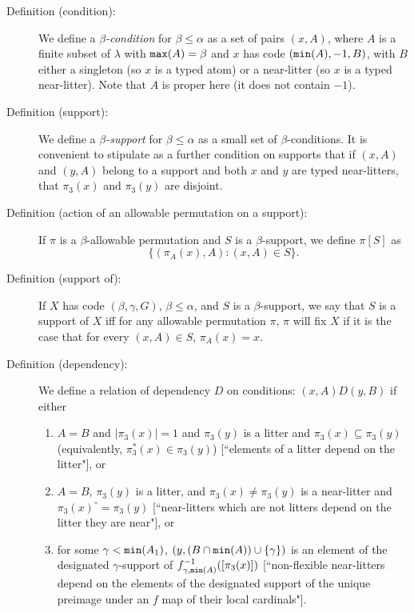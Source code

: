\documentclass[112pt]{article}
\begin{document}
\begin{description}

\item[Definition (condition):]  We define a {\em $\beta$-condition\/} for $\beta\leq \alpha$ as a set of pairs $(x,A)$, where $A$ is a finite subset of $\lambda$ with ${\tt max}(A)=\beta$ and $x$ has code $({\tt min}(A),-1,B)$, with $B$ either a singleton (so $x$ is a typed atom) or a near-litter (so $x$ is a typed near-litter).  Note that $A$ is proper here (it does not contain $-1$).

\item[Definition (support):]  We define a {\em $\beta$-support\/} for $\beta\leq\alpha$ as a small set of $\beta$-conditions.  It is convenient to stipulate
as a further condition on supports that if $(x,A)$ and $(y,A)$ belong to a support and both $x$ and $y$ are typed near-litters, that $\pi_3(x)$ and $\pi_3(y)$  are disjoint.

\item[Definition (action of an allowable permutation on a support):]  If $\pi$ is a $\beta$-allowable permutation and $S$ is a $\beta$-support,
we define $\pi[S]$ as $$\{(\pi_A(x),A):(x,A) \in S\}.$$

\item[Definition (support of):]  If $X$ has code $(\beta,\gamma,G)$, $\beta\leq \alpha$, and $S$ is a $\beta$-support, we say that $S$ is a support of $X$ 
iff for any allowable permutation $\pi$, $\pi$ will fix $X$ if it is the case that for every $(x,A)\in S$, $\pi_A(x)=x$.

\item[Definition (dependency):]  We define a relation of dependency $D$ on conditions:  $(x,A)D(y,B)$  if either 

\begin{enumerate}
\item $A=B$ and $|\pi_3(x)|=1$ and $\pi_3(y)$ is a litter and $\pi_3(x) \subseteq \pi_3(y)$ (equivalently, $\pi_3^*(x) \in \pi_3(y)$) [``elements of a litter depend on the litter"], or 

\item $A=B$, $\pi_3(y)$ is a litter, and $\pi_3(x) \neq \pi_3(y)$ is a near-litter and $\pi_3(x)^\circ = \pi_3(y)$ [``near-litters which are not litters depend on the litter they are near"], or 

\item for some $\gamma<{\tt min}(A_1)$, $(y,(B\cap {\tt min}(A)) \cup \{\gamma\})$ is an element of the designated $\gamma$-support of $f_{\gamma,{\tt min}(A)}^{-1}([\pi_3(x)])$ [``non-flexible near-litters depend on the elements of the designated support of the unique preimage under an $f$ map of their local cardinals"].
\end{enumerate}


\end{description}
\end{document}
